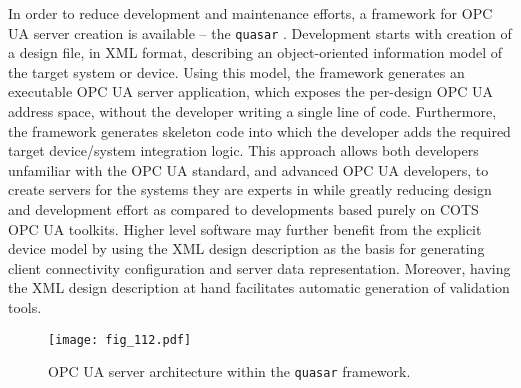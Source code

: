 \documentclass[cernpreprint, atlasdraft=false, UKenglish,british,orcidlogo, texmf, orcidlogo]{atlasdoc}
\begin{document}
 
In order to reduce development and maintenance efforts, a framework
for \gls{OPC UA}  server creation is available -- the
\texttt{\gls{quasar}} \cite{bib:quasar, bib:quasar_CHEP}. Development starts with
creation of a design file, in \gls{XML} format, describing an
object-oriented information model of the target system or
device. Using this model, the framework generates an executable \gls{OPC UA}
server application, which exposes the per-design \gls{OPC UA}  address
space, without the developer writing a single line of
code. Furthermore, the framework generates skeleton code into which
the developer adds the required target device/system integration
logic.  This approach allows both developers unfamiliar with the \gls{OPC UA}  standard, and advanced \gls{OPC UA}  developers, to create servers
for the systems they are experts in while greatly reducing design and
development effort as compared to developments based purely on \gls{COTS}
\gls{OPC UA}  toolkits. Higher level software may further benefit from
the explicit device model by using the \gls{XML} design description as the
basis for generating client connectivity configuration and server data
representation. Moreover, having the \gls{XML} design description at hand
facilitates automatic generation of validation tools.
 
\begin{figure}[pht]
\begin{center}
\texttt{[image: fig\_112.pdf]}
\caption{\label{fig:DCS:quasar} \gls{OPC UA}  server architecture within the \texttt{\gls{quasar}} framework.}
\end{center}
\end{figure}
 
\end{document}
